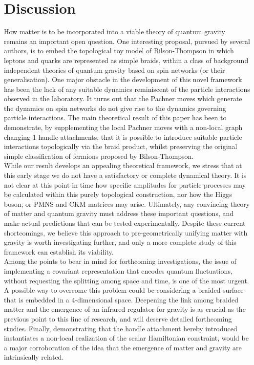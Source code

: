 \documentclass[aps,nofootinbib,amsfonts,superscriptaddress]{revtex4}
\begin{document}
\section{Discussion}
\label{Sec:Discussion}

How matter is to be incorporated into a viable theory of quantum gravity remains an important open question. One interesting proposal, pursued by several authors, is to embed the topological toy model of Bilson-Thompson in which leptons and quarks are represented as simple braids, within a class of background independent theories of quantum gravity based on spin networks (or their generalisation). One major obstacle in the development of this novel framework has been the lack of any suitable dynamics reminiscent of the particle interactions observed in the laboratory. It turns out that the Pachner moves which generate the dynamics on spin networks do not give rise to the dynamics governing particle interactions. The main theoretical result of this paper has been to demonstrate, by supplementing the local Pachner moves with a non-local graph changing 1-handle attachments, that it is possible to introduce suitable particle interactions topologically via the braid product, whilst preserving the original simple classification of fermions proposed by Bilson-Thompson.\\

While our result develops an appealing theoretical framework, we stress that at this early stage we do not have a satisfactory or complete dynamical theory. It is not clear at this point in time how specific amplitudes for particle processes may be calculated within this purely topological construction, nor how the Higgs boson, or PMNS and CKM matrices may arise. Ultimately, any convincing theory of matter and quantum gravity must address these important questions, and make actual predictions that can be tested experimentally. Despite these current shortcomings, we believe this approach to pre-geometrically unifying matter with gravity is worth investigating further, and only a more complete study of this framework can establish its viability.\\




Among the points to bear in mind for forthcoming investigations, the issue of implementing a covariant representation that encodes quantum fluctuations, without requesting the splitting among space and time, is one of the most urgent. A possible way to overcome this problem could be considering a braided surface that is embedded in a $4$-dimensional space. Deepening the link among braided matter and the emergence of an infrared regulator for gravity is as crucial as the previous point to this line of research, and will deserve detailed forthcoming studies. Finally, demonstrating that the handle attachment hereby introduced instantiates a non-local realization of the scalar Hamiltonian  constraint, would be a major corroboration of the idea that the emergence of matter and gravity are intrinsically related.
\end{document}
